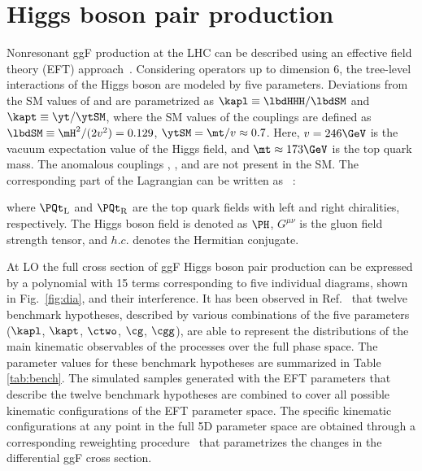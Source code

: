 \documentclass[11pt,a4paper,cmspaper,final,collab]{cms-tdr}
\begin{document}
\section{Higgs boson pair production}
\label{sec:BSM}
Nonresonant ggF \HH production at the LHC can be described using an effective field theory (EFT) approach~\cite{deFlorian:2016spz}. Considering operators up to dimension 6, the tree-level interactions of the Higgs boson are modeled by five parameters. Deviations from the SM values of \lbdHHH and \yt are parametrized as $\kapl \equiv \lbdHHH/\lbdSM$ and $\kapt \equiv \yt/\ytSM$, where the SM values of the couplings are defined as $\lbdSM \equiv \mH^2 /(2 v^2) = 0.129$, $\ytSM = \mt/v \approx 0.7$. Here, $v = 246\GeV$ is the vacuum expectation value of the Higgs field, and $\mt \approx 173\GeV$ is the top quark mass. The anomalous couplings \cgg, \ctwo, and \cg are not present in the SM. The corresponding part of the Lagrangian can be written as ~\cite{Giudice:2007fh}:

where  $\PQt_\text{L}$ and $\PQt_\text{R}$ are the top quark fields with left and right chiralities, respectively. The Higgs boson field is denoted as $\PH$, $G^{\mu \nu}$ is the gluon field strength tensor, and $h.c.$ denotes the Hermitian conjugate.

At LO the full cross section of ggF Higgs boson pair production can be expressed by a polynomial with 15 terms corresponding to five individual diagrams, shown in Fig.~\ref{fig:dia}, and their interference.
It has been observed in Ref.~\cite{Dall'Osso:2015aia} that twelve benchmark hypotheses, described by various combinations of the five parameters ($\kapl$, $\kapt$, $\ctwo$, $\cg$, $\cgg$), are able to represent the distributions of the main kinematic observables of the \HH processes over the full phase space. The parameter values for these benchmark hypotheses are summarized in Table \ref{tab:bench}. The simulated samples generated with the EFT parameters that describe the twelve benchmark hypotheses are combined to cover all possible kinematic configurations of the EFT parameter space.
 The specific kinematic configurations at any point in the full 5D parameter space are obtained through a corresponding reweighting procedure~\cite{Dall'Osso:2015aia} that parametrizes the changes in the differential ggF \HH cross section. 
\end{document}
